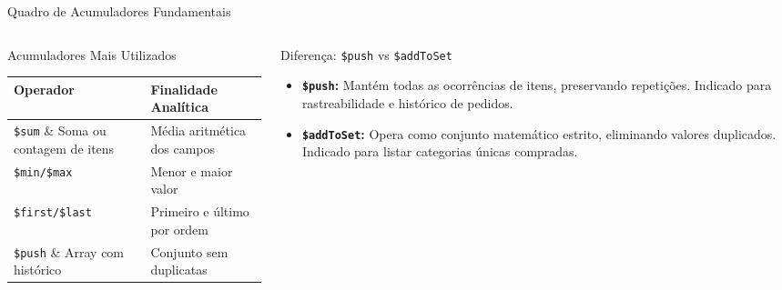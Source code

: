 \begin{frame}[fragile]{Quadro de Acumuladores Fundamentais}
  \vspace{0.05cm}
  \begin{columns}[t,onlytextwidth]
    \begin{column}{0.45\textwidth}
      \alert{Acumuladores Mais Utilizados}\par
      \vspace{0.4cm}
      \scriptsize
      \begin{tabular}{@{}lp{3.8cm}@{}}
        \toprule
        \textbf{Operador} & \textbf{Finalidade Analítica} \\
        \midrule
        \lstinline[language=mongosh, basicstyle=\footnotesize\ttfamily]|$sum| & Soma ou contagem de itens \\
        \lstinline[language=mongosh, basicstyle=\footnotesize\ttfamily]|$avg| & Média aritmética dos campos \\
        \lstinline[language=mongosh, basicstyle=\footnotesize\ttfamily]|$min/$max| & Menor e maior valor \\
        \lstinline[language=mongosh, basicstyle=\footnotesize\ttfamily]|$first/$last| & Primeiro e último por ordem \\
        \lstinline[language=mongosh, basicstyle=\footnotesize\ttfamily]|$push| & Array com histórico \\
        \lstinline[language=mongosh, basicstyle=\footnotesize\ttfamily]|$addToSet| & Conjunto sem duplicatas \\
        \bottomrule
      \end{tabular}
    \end{column}
    \begin{column}{0.51\textwidth}
      \alert{Diferença: \texttt{\$push} vs \texttt{\$addToSet}}\par
    
      \begin{itemize}
        \item \textbf{\texttt{\$push}:} Mantém todas as ocorrências de itens, preservando repetições. Indicado para rastreabilidade e histórico de pedidos.
        \item \textbf{\texttt{\$addToSet}:} Opera como conjunto matemático estrito, eliminando valores duplicados. Indicado para listar categorias únicas compradas.
      \end{itemize}
    \end{column}
  \end{columns}
\end{frame}

